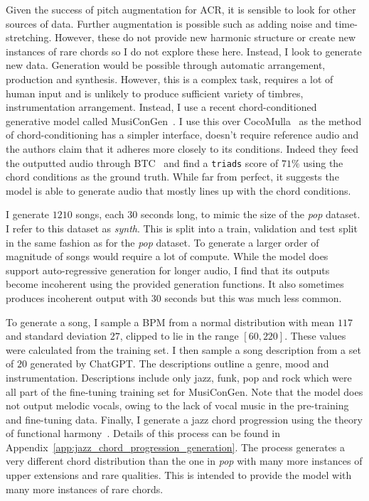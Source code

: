 Given the success of pitch augmentation for ACR, it is sensible to look for other sources of data. Further augmentation is possible such as adding noise and time-stretching. However, these do not provide new harmonic structure or create new instances of rare chords so I do not explore these here. Instead, I look to generate new data.  Generation would be possible through automatic arrangement, production and synthesis. However, this is a complex task, requires a lot of human input and is unlikely to produce sufficient variety of timbres, instrumentation arrangement. Instead, I use a recent chord-conditioned generative model called MusiConGen~\citep{MusiConGen}. I use this over CocoMulla~\citep{CocoMulla} as the method of chord-conditioning has a simpler interface, doesn't require reference audio and the authors claim that it adheres more closely to its conditions. Indeed they feed the outputted audio through BTC~\citep{BTC} and find a \texttt{triads} score of $71\%$ using the chord conditions as the ground truth. While far from perfect, it suggests the model is able to generate audio that mostly lines up with the chord conditions.

I generate $1210$ songs, each $30$ seconds long, to mimic the size of the \emph{pop} dataset. I refer to this dataset as \emph{synth}. This is split into a train, validation and test split in the same fashion as for the \emph{pop} dataset. To generate a larger order of magnitude of songs would require a lot of compute. While the model does support auto-regressive generation for longer audio, I find that its outputs become incoherent using the provided generation functions. It also sometimes produces incoherent output with $30$ seconds but this was much less common.

To generate a song, I sample a BPM from a normal distribution with mean $117$ and standard deviation $27$, clipped to lie in the range $[60,220]$. These values were calculated from the training set. I then sample a song description from a set of $20$ generated by ChatGPT. The descriptions outline a genre, mood and instrumentation. Descriptions include only jazz, funk, pop and rock which were all part of the fine-tuning training set for MusiConGen. Note that the model does not output melodic vocals, owing to the lack of vocal music in the pre-training and fine-tuning data. Finally, I generate a jazz chord progression using the theory of functional harmony~\citet{GenerativeGrammarJazz}. Details of this process can be found in Appendix~\ref{app:jazz_chord_progression_generation}. The process generates a very different chord distribution than the one in \emph{pop} with many more instances of upper extensions and rare qualities. This is intended to provide the model with many more instances of rare chords. 


